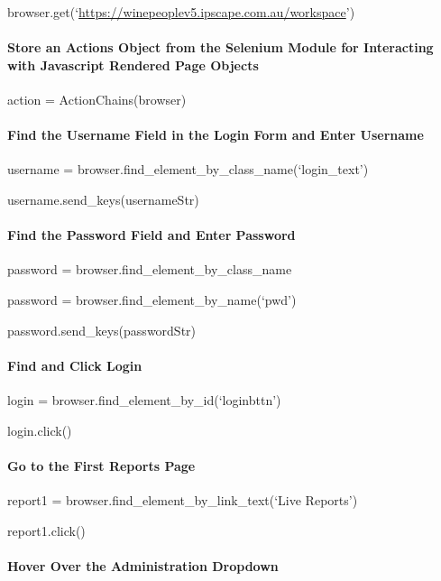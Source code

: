 \documentclass[]{article}
\let\oldparagraph\paragraph
\renewcommand{\paragraph}[1]{\oldparagraph{#1}\mbox{}}
\begin{document}
browser.get(`\url{https://winepeoplev5.ipscape.com.au/workspace}')

\paragraph{Store an Actions Object from the Selenium Module for
Interacting with Javascript Rendered Page
Objects}\label{store-an-actions-object-from-the-selenium-module-for-interacting-with-javascript-rendered-page-objects}

action = ActionChains(browser)

\paragraph{Find the Username Field in the Login Form and Enter
Username}\label{find-the-username-field-in-the-login-form-and-enter-username}

username = browser.find\_element\_by\_class\_name(`login\_text')

username.send\_keys(usernameStr)

\paragraph{Find the Password Field and Enter
Password}\label{find-the-password-field-and-enter-password}

password = browser.find\_element\_by\_class\_name

password = browser.find\_element\_by\_name(`pwd')

password.send\_keys(passwordStr)

\paragraph{Find and Click Login}\label{find-and-click-login}

login = browser.find\_element\_by\_id(`loginbttn')

login.click()

\paragraph{Go to the First Reports
Page}\label{go-to-the-first-reports-page}

report1 = browser.find\_element\_by\_link\_text(`Live Reports')

report1.click()

\paragraph{Hover Over the Administration
Dropdown}\label{hover-over-the-administration-dropdown}
\end{document}
